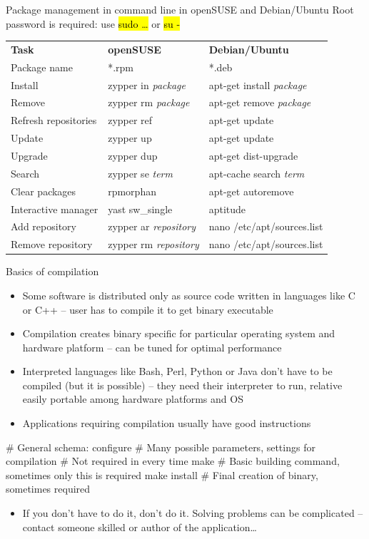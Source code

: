 \documentclass[compress, ucs, xelatex, 11pt, xcolor=svgnames,
  hyperref={
    bookmarks=true,
    unicode=true,
    colorlinks=true,
    pdftitle={Linux, command line and MetaCentrum},
    plainpages=false,
    pdfauthor={Vojtech Zeisek},
    pdfsubject={Course about use of Linux command line, writing shell scripts and using MetaCentrum of CESNET},
    pdfcreator={XeLaTeX},
    pdfkeywords={Linux, GNU, BASH, shell, command line, MetaCentrum},
    linkcolor=DarkRed,
    anchorcolor=DarkBlue,
    citecolor=Indigo,
    filecolor=NavyBlue,
    menucolor=DarkMagenta,
    urlcolor=DarkBlue,
    pdftex},
  url={hyphens, lowtilde} %
  ]{beamer}
\renewcommand{\texttt}[1]{\hl{\ttfamily #1}}
\begin{document}
\begin{frame}{Package management in command line in openSUSE and Debian/Ubuntu}
Root password is required: use \texttt{sudo \ldots} or \texttt{su -}
\begin{center}
\begin{tabular}{lll}
\textbf{Task} & \textbf{openSUSE} & \textbf{Debian/Ubuntu}\\
Package name & *.rpm & *.deb\\
Install & zypper in \textit{package} & apt-get install \textit{package}\\
Remove & zypper rm \textit{package} & apt-get remove \textit{package}\\
Refresh repositories & zypper ref & apt-get update\\
Update & zypper up & apt-get update\\
Upgrade & zypper dup & apt-get dist-upgrade\\
Search & zypper se \textit{term} & apt-cache search \textit{term}\\
Clear packages & rpmorphan & apt-get autoremove\\
Interactive manager & yast sw\_single & aptitude\\
Add repository & zypper ar \textit{repository} & nano /etc/apt/sources.list\\
Remove repository & zypper rm \textit{repository} & nano /etc/apt/sources.list
\end{tabular}
\end{center}
\end{frame}

\begin{frame}[fragile]{Basics of compilation}
\begin{itemize}
  \item Some software is distributed only as source code written in languages like C or C++ -- user has to compile it to get binary executable
  \item Compilation creates binary specific for particular operating system and hardware platform -- can be tuned for optimal performance
  \item Interpreted languages like Bash, Perl, Python or Java don't have to be compiled (but it is possible) -- they need their interpreter to run, relative easily portable among hardware platforms and OS
  \item Applications requiring compilation usually have good instructions
\end{itemize}
  \begin{bashcode}
    # General schema:
    configure # Many possible parameters, settings for compilation
              # Not required in every time
    make # Basic building command, sometimes only this is required
    make install # Final creation of binary, sometimes required
  \end{bashcode}
\begin{itemize}
  \item If you don't have to do it, don't do it. Solving problems can be complicated -- contact someone skilled or author of the application\ldots
\end{itemize}
\end{frame}
\end{document}

